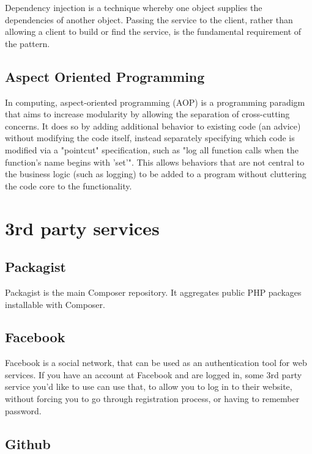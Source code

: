 Dependency injection is a technique whereby one object supplies the dependencies of another object. Passing the service to the client, rather than allowing a client to build or find the service, is the fundamental requirement of the pattern.~\cite{fowler:di}

\subsection{Aspect Oriented Programming} \label{sec:theory:aop}

In computing, aspect-oriented programming (AOP) is a programming paradigm that aims to increase modularity by allowing the separation of cross-cutting concerns. It does so by adding additional behavior to existing code (an advice) without modifying the code itself, instead separately specifying which code is modified via a "pointcut" specification, such as "log all function calls when the function's name begins with 'set'". This allows behaviors that are not central to the business logic (such as logging) to be added to a program without cluttering the code core to the functionality.~\cite{wiki:aop}

\section{3rd party services}

\subsection{Packagist} \label{sec:theory:packagist}

Packagist is the main Composer repository. It aggregates public PHP packages installable with Composer.~\cite{packagist:homepage}

\subsection{Facebook} \label{sec:theory:facebook}

Facebook is a social network, that can be used as an authentication tool for web services. If you have an account at Facebook and are logged in, some 3rd party service you'd like to use can use that, to allow you to log in to their website, without forcing you to go through registration process, or having to remember password.

\subsection{Github} \label{sec:theory:github}

